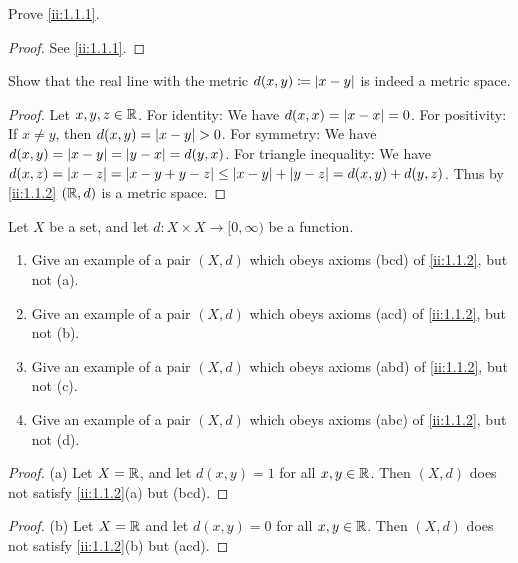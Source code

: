 \exercisesection

\begin{ex}\label{ii:ex:1.1.1}
  Prove \cref{ii:1.1.1}.
\end{ex}

\begin{proof}
  See \cref{ii:1.1.1}.
\end{proof}

\begin{ex}\label{ii:ex:1.1.2}
  Show that the real line with the metric \(d(x, y) \coloneqq \left\lvert x - y\right\rvert\) is indeed a metric space.
\end{ex}

\begin{proof}
  Let \(x, y, z \in \mathbb{R}\).
  For identity:
  We have \(d(x, x) = \left\lvert x - x\right\rvert = 0\).
  For positivity:
  If \(x \neq y\), then \(d(x, y) = \left\lvert x - y\right\rvert > 0\).
  For symmetry:
  We have \(d(x, y) = \left\lvert x - y\right\rvert = \left\lvert y - x\right\rvert = d(y, x)\).
  For triangle inequality:
  We have \(d(x, z) = \left\lvert x - z\right\rvert = \left\lvert x - y + y - z\right\rvert \leq \left\lvert x - y\right\rvert + \left\lvert y - z\right\rvert = d(x, y) + d(y, z)\).
  Thus by \cref{ii:1.1.2} \((\mathbb{R}, d)\) is a metric space.
\end{proof}

\begin{ex}\label{ii:ex:1.1.3}
  Let \(X\) be a set, and let \(d : X \times X \to [0, \infty)\) be a function.
  \begin{enumerate}
    \item Give an example of a pair \((X, d)\) which obeys axioms (bcd) of \cref{ii:1.1.2}, but not (a).
    \item Give an example of a pair \((X, d)\) which obeys axioms (acd) of \cref{ii:1.1.2}, but not (b).
    \item Give an example of a pair \((X, d)\) which obeys axioms (abd) of \cref{ii:1.1.2}, but not (c).
    \item Give an example of a pair \((X, d)\) which obeys axioms (abc) of \cref{ii:1.1.2}, but not (d).
  \end{enumerate}
\end{ex}

\begin{proof}{(a)}
  Let \(X = \mathbb{R}\), and let \(d(x, y) = 1\) for all \(x, y \in \mathbb{R}\).
  Then \((X, d)\) does not satisfy \cref{ii:1.1.2}(a) but (bcd).
\end{proof}

\begin{proof}{(b)}
  Let \(X = \mathbb{R}\) and let \(d(x, y) = 0\) for all \(x, y \in \mathbb{R}\).
  Then \((X, d)\) does not satisfy \cref{ii:1.1.2}(b) but (acd).
\end{proof}

